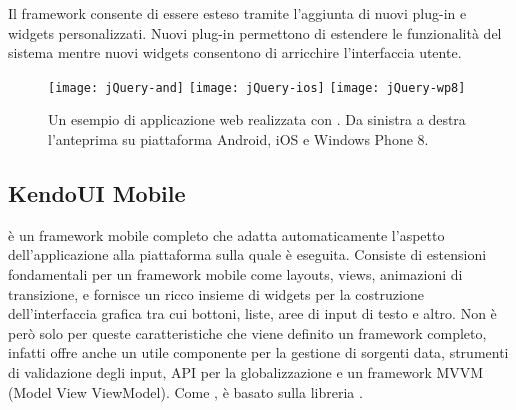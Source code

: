             Il frame\-work consente di essere esteso tramite l'aggiunta di nuovi
            plug-in e widgets personalizzati. Nuovi plug-in permettono di
            estendere le funzionalità del sistema mentre nuovi widgets
            consentono di arricchire l'interfaccia utente.
            \begin{figure}[h]
                \centering
                \texttt{[image: jQuery-and]}
                \texttt{[image: jQuery-ios]}
                \texttt{[image: jQuery-wp8]}
                \caption{
                    Un esempio di applicazione web realizzata con \jqm{}.
                    Da sinistra a destra l'anteprima su piattaforma Android, iOS
                    e Windows Phone 8.
                }
                \label{fig:jquery}
            \end{figure}

        \subsection{KendoUI Mobile}
        \label{subsec:kendo}
            \kendomob{} è un frame\-work mobile completo che adatta
            automaticamente l'aspetto dell'applicazione alla piattaforma sulla
            quale è eseguita. Consiste di estensioni fondamentali per un
            frame\-work mobile come layouts, views, animazioni di transizione,
            e fornisce un ricco insieme di widgets per la costruzione
            dell'interfaccia grafica tra cui bottoni, liste, aree di input di
            testo e altro. Non è però solo per queste caratteristiche che viene
            definito un frame\-work completo, infatti \kendomob{} offre anche
            un utile componente per la gestione di sorgenti data, strumenti di
            validazione degli input, API per la globalizzazione e un frame\-work
            MVVM (Model View ViewModel). Come \jqm{}, \kendomob{} è
            basato sulla libreria \js{} \jq{}.

